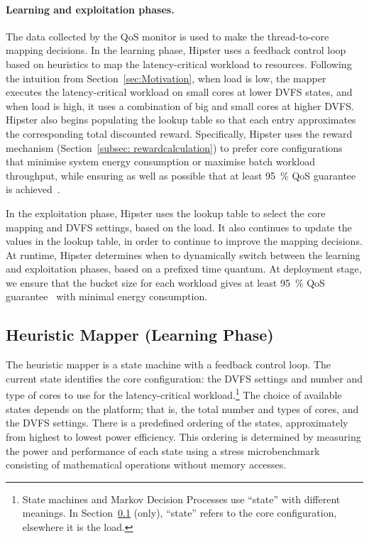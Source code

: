 \paragraph*{Learning and exploitation phases.} The data collected by the QoS monitor is used
to make the thread-to-core mapping decisions. In the learning phase, Hipster uses a
feedback control loop based on heuristics to map the latency-critical workload to
resources. Following the intuition from Section~\ref{sec:Motivation}, when load is low,
the mapper executes the latency-critical workload on small cores at lower DVFS states, and
when load is high, it uses a combination of big and small cores at higher DVFS.  Hipster
also begins populating the lookup table so that each entry approximates the corresponding
total discounted reward.  Specifically, Hipster uses the reward mechanism
(Section~\ref{subsec: rewardcalculation}) to prefer core configurations that minimise
system energy consumption or maximise batch workload throughput, while ensuring as well as
possible that at least \SI{95}{\percent} QoS guarantee is achieved~\citep{Horvath2007DynamicControl}.

In the exploitation phase, Hipster uses the lookup table to select the core mapping and
DVFS settings, based on the load. It also continues to update the values in the lookup
table, in order to continue to improve the mapping decisions. At runtime, Hipster
determines when to dynamically switch between the learning and exploitation phases, based
on a prefixed time quantum. At deployment stage, we ensure that the bucket size for each
workload gives at least \SI{95}{\percent} QoS guarantee~\citep{Li2014TalesTail} with minimal energy
consumption.

\subsection{Heuristic Mapper (Learning Phase)}
\label{subsec: hybrid}

The heuristic mapper is a state machine with a feedback control loop. The current state
identifies the core configuration: the DVFS settings and number and type of cores to use
for the latency-critical workload.\footnote{State machines and Markov Decision Processes
use ``state'' with different meanings. In Section~\ref{subsec: hybrid} (only), ``state''
refers to the core configuration, elsewhere it is the load.} The choice of available
states depends on the platform; that is, the total number and types of cores, and the DVFS
settings. There is a predefined ordering of the states, approximately from highest to
lowest power efficiency. This ordering is determined by measuring the power and
performance of each state using a stress microbenchmark consisting of mathematical
operations without memory accesses.

